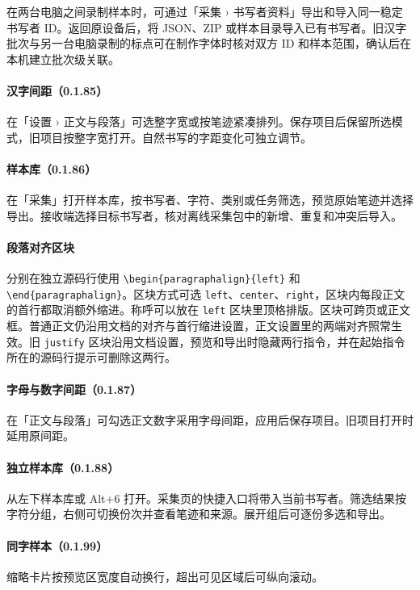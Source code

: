 在两台电脑之间录制样本时，可通过「采集 › 书写者资料」导出和导入同一稳定书写者 ID。返回原设备后，将 JSON、ZIP 或样本目录导入已有书写者。旧汉字批次与另一台电脑录制的标点可在制作字体时核对双方 ID 和样本范围，确认后在本机建立批次级关联。

\paragraph{汉字间距（0.1.85）}在「设置 › 正文与段落」可选整字宽或按笔迹紧凑排列。保存项目后保留所选模式，旧项目按整字宽打开。自然书写的字距变化可独立调节。

\paragraph{样本库（0.1.86）}在「采集」打开样本库，按书写者、字符、类别或任务筛选，预览原始笔迹并选择导出。接收端选择目标书写者，核对离线采集包中的新增、重复和冲突后导入。

\paragraph{段落对齐区块}分别在独立源码行使用 \verb|\begin{paragraphalign}{left}| 和 \verb|\end{paragraphalign}|。区块方式可选 \texttt{left}、\texttt{center}、\texttt{right}，区块内每段正文的首行都取消额外缩进。称呼可以放在 \texttt{left} 区块里顶格排版。区块可跨页或正文框。普通正文仍沿用文档的对齐与首行缩进设置，正文设置里的两端对齐照常生效。旧 \texttt{justify} 区块沿用文档设置，预览和导出时隐藏两行指令，并在起始指令所在的源码行提示可删除这两行。

\paragraph{字母与数字间距（0.1.87）}在「正文与段落」可勾选正文数字采用字母间距，应用后保存项目。旧项目打开时延用原间距。

\paragraph{独立样本库（0.1.88）}从左下样本库或 Alt+6 打开。采集页的快捷入口将带入当前书写者。筛选结果按字符分组，右侧可切换份次并查看笔迹和来源。展开组后可逐份多选和导出。

\paragraph{同字样本（0.1.99）}缩略卡片按预览区宽度自动换行，超出可见区域后可纵向滚动。

